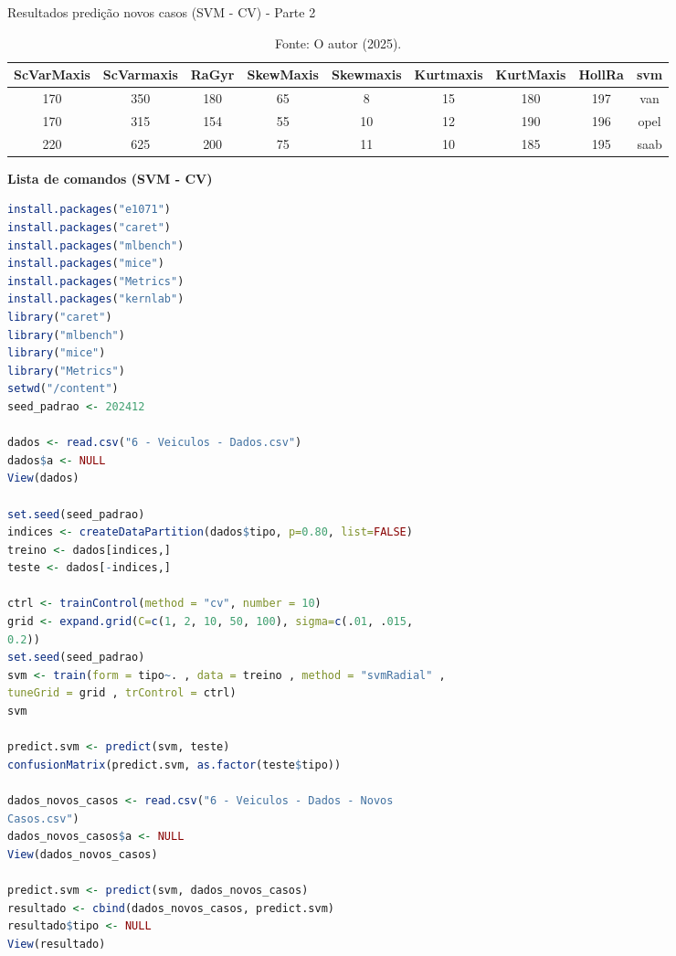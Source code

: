 \begin{table}[H]
\caption{Resultados predição novos casos (SVM - CV) - Parte 2 }
\hspace*{-2.5cm} %
\begin{minipage}{\textwidth}
\centering
\begin{tabular}{|c|c|c|c|c|c|c|c|c|}
\hline
ScVarMaxis & ScVarmaxis & RaGyr & SkewMaxis & Skewmaxis & Kurtmaxis & KurtMaxis & HollRa & svm \\
\hline
170 & 350 & 180 & 65 & 8  & 15 & 180 & 197 & van \\
\hline
170 & 315 & 154 & 55 & 10 & 12 & 190 & 196 & opel \\
\hline
220 & 625 & 200 & 75 & 11 & 10 & 185 & 195 & saab \\
\hline
\end{tabular}
\end{minipage}
\caption*{Fonte: O autor (2025).}
\end{table}


\begin{center}
    \textbf{Lista de comandos (SVM - CV)}
\end{center}

\begin{lstlisting}[language=R, style=input]
install.packages("e1071")
install.packages("caret")
install.packages("mlbench")
install.packages("mice")
install.packages("Metrics")
install.packages("kernlab")
library("caret")
library("mlbench")
library("mice")
library("Metrics")
setwd("/content")
seed_padrao <- 202412

dados <- read.csv("6 - Veiculos - Dados.csv")
dados$a <- NULL
View(dados)

set.seed(seed_padrao)
indices <- createDataPartition(dados$tipo, p=0.80, list=FALSE)
treino <- dados[indices,]
teste <- dados[-indices,]

ctrl <- trainControl(method = "cv", number = 10)
grid <- expand.grid(C=c(1, 2, 10, 50, 100), sigma=c(.01, .015,
0.2))
set.seed(seed_padrao)
svm <- train(form = tipo~. , data = treino , method = "svmRadial" ,
tuneGrid = grid , trControl = ctrl)
svm

predict.svm <- predict(svm, teste)
confusionMatrix(predict.svm, as.factor(teste$tipo))

dados_novos_casos <- read.csv("6 - Veiculos - Dados - Novos
Casos.csv")
dados_novos_casos$a <- NULL
View(dados_novos_casos)

predict.svm <- predict(svm, dados_novos_casos)
resultado <- cbind(dados_novos_casos, predict.svm)
resultado$tipo <- NULL
View(resultado)
\end{lstlisting}

